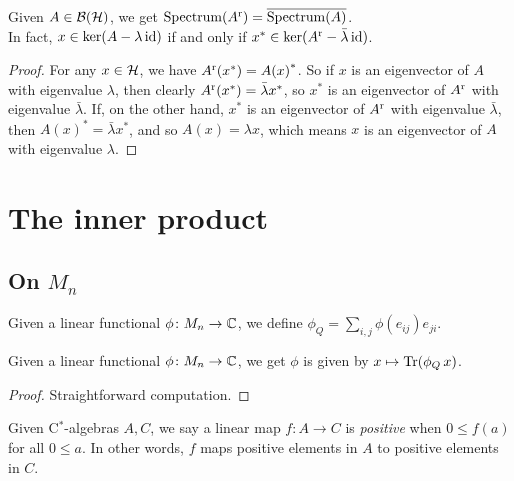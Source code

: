  \begin{proposition}\label{LinearMap.real.spectrum}\leanok
  Given $A\in\mathcal{B}(\mathcal{H})$, we get $\operatorname{Spectrum}({A}^{\operatorname{r}})=\overline{\operatorname{Spectrum}(A)}$.\\
  In fact, $x\in\ker(A-\lambda\operatorname{id})$ if and only if $x^*\in\ker({A}^{\operatorname{r}}-\bar{\lambda}\operatorname{id})$.
 \end{proposition}
 \begin{proof}\leanok
  For any $x\in\mathcal{H}$, we have ${A}^{\operatorname{r}}(x^*)={A(x)}^*$. So if $x$ is an eigenvector of $A$ with eigenvalue $\lambda$, then clearly ${A}^{\operatorname{r}}(x^*)=\bar{\lambda}x^*$, so $x^*$ is an eigenvector of ${A}^{\operatorname{r}}$ with eigenvalue $\bar{\lambda}$.
  If, on the other hand, $x^*$ is an eigenvector of ${A}^{\operatorname{r}}$ with eigenvalue $\bar{\lambda}$, then ${A(x)}^*=\bar{\lambda}x^*$, and so $A(x)=\lambda x$, which means $x$ is an eigenvector of $A$ with eigenvalue $\lambda$.
 \end{proof}

\chapter{The inner product}

 \section{On $M_n$}

  \begin{definition}\label{Dual.matrix}\leanok
   Given a linear functional $\phi\colon M_n \to \mathbb{C}$, we define $\phi_Q=\sum_{i,j}\phi(e_{ij})e_{ji}$.
  \end{definition}

  \begin{lemma}\label{dual_eq_trace}\leanok
   Given a linear functional $\phi\colon M_n\to\mathbb{C}$, we get $\phi$ is given by $x\mapsto\operatorname{Tr}(\phi_Q \,x)$.
  \end{lemma}
  \begin{proof}\leanok
   Straightforward computation.
  \end{proof}

  \begin{definition}\label{LinearMap.IsPosMap}\leanok
   Given C$^*$-algebras $A,C$, we say a linear map $f\colon A \to C$ is \textit{positive} when $0\leq f(a)$ for all $0\leq a$. In other words, $f$ maps positive elements in $A$ to positive elements in $C$.
  \end{definition}

